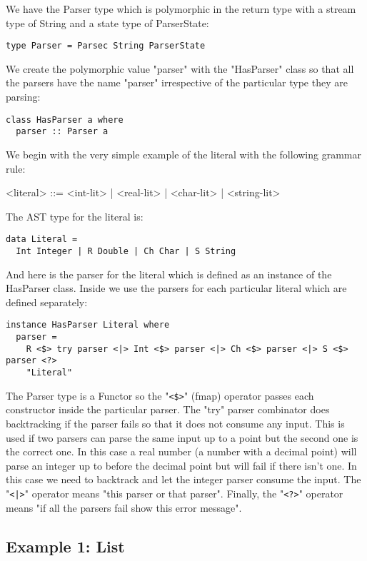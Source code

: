 \documentclass[diploma]{softlab-thesis}
\begin{document}
We have the Parser type which is polymorphic in the return
type with a stream type of String and a state type of ParserState:
\begin{verbatim}
type Parser = Parsec String ParserState

\end{verbatim}
We create the polymorphic value "parser" with the "HasParser" class
so that all the parsers have the name "parser" irrespective of the particular
type they are parsing:
\begin{verbatim}
class HasParser a where
  parser :: Parser a

\end{verbatim}
We begin with the very simple example of the literal with the following
grammar rule:
\begin{grammar}
<literal> ::= <int-lit> | <real-lit> | <char-lit> | <string-lit>\\
\end{grammar}
The AST type for the literal is:
\begin{verbatim}
data Literal =
  Int Integer | R Double | Ch Char | S String

\end{verbatim}
And here is the parser for the literal which is defined as an instance of
the HasParser class. Inside we use the parsers for each particular literal
which are defined separately:
\begin{verbatim}
instance HasParser Literal where
  parser =
    R <$> try parser <|> Int <$> parser <|> Ch <$> parser <|> S <$> parser <?>
    "Literal"

\end{verbatim}
The Parser type is a Functor so the "\verb|<$>|" (fmap) operator passes each
constructor inside the particular parser. The "try" parser combinator does
backtracking if the parser fails so that it does not consume any input. This is
used if two parsers can parse the same input up to a point but the second one
is the correct one. In this case a real number (a number with a decimal point)
will parse an integer up to before the decimal point but will fail if there
isn't one. In this case we need to backtrack and let the integer parser consume
the input.  The "\texttt{<|>}" operator means "this parser or that parser".
Finally, the "\verb|<?>|" operator means "if all the parsers fail show this
error message".

\newpage
\subsection{Example 1: List}
\end{document}
